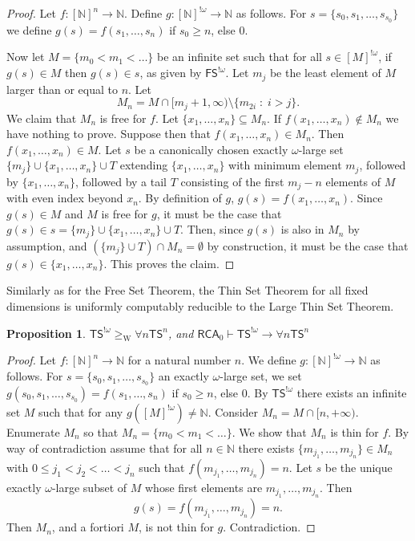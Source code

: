 \documentclass{article}
\newcommand{\RCA}[0]{\mathsf{RCA}}
\newcommand{\FS}[0]{\mathsf{FS}}
\newcommand{\TS}[0]{\mathsf{TS}}
\newcommand{\NN}[0]{\mathbb{N}}
\newcommand{\W}{\mathrm{W}}
\numberwithin{theorem}{section}
\newtheorem{proposition}[theorem]{Proposition}
\begin{document}
\begin{proof}
Let $f:[\NN]^n\to \NN$. Define $g:[\NN]^{!\omega} \to \NN$ as follows. For $s = \{s_0, s_1, \dots, s_{s_0}\}$ we define 
$g(s) = f(s_1, \dots, s_n)$ if $s_0 \geq n$, else $0$. 

Now let $M= \{ m_0 < m_1 < \dots\}$ be an infinite set such that for all $s\in [M]^{!\omega}$, if $g(s) \in M$ then 
$g(s) \in s$, as given by $\FS^{!\omega}$.
Let $m_j$ be the least element of $M$ larger than or equal to $n$. Let 
$$M_n=M \cap [m_j + 1, \infty) \setminus \{ m_{2i} \;:\; i > j \}.$$ 
We claim that $M_n$ is free for $f$. Let $\{x_1, \dots, x_n\}\subseteq M_n$. 
If $f(x_1, \dots, x_n) \notin M_n$ we have nothing to prove. Suppose then that
$f(x_1, \dots, x_n) \in M_n$. Then $f(x_1, \dots, x_n) \in M$. 
Let $s$ be a canonically chosen exactly $\omega$-large set $\{m_j\}\cup \{ x_1, \dots, x_n\} \cup T$
extending $\{x_1, \dots, x_n\}$ with minimum 
element $m_j$, followed by $\{x_1, \dots, x_n\}$, followed by a tail $T$ consisting of the first $m_j - n$ elements of $M$ with even index
beyond $x_n$. 
By definition of $g$, $g(s) = f(x_1, \dots, x_n)$. Since $g(s) \in M$ and $M$ is free for $g$, 
it must be the case that $g(s) \in s=\{m_j\}\cup \{ x_1, \dots, x_n\} \cup T$. Then, since $g(s)$ is also in $M_n$ by assumption, 
and $(\{m_j\}\cup T) \cap M_n = \emptyset$ by construction, 
it must be the case that $g(s) \in \{x_1, \dots, x_n\}$. This proves the claim. 
\end{proof}

Similarly as for the Free Set Theorem, the Thin Set Theorem for all fixed dimensions is uniformly computably reducible to the Large Thin Set Theorem. 

\begin{proposition}
$\TS^{!\omega} \geq_{\W} \forall n \TS^n$, and $\RCA_0\vdash \TS^{!\omega} \to \forall n \TS^n$
\end{proposition}
\begin{proof}
	Let  $f:[\NN]^{n}\to\NN$ for a natural number $n$. We define $g:[\NN]^{!\omega}\to \NN$ as follows.
	For $s=\{s_0,s_1,\dots,s_{s_0}\}$ an exactly $\omega$-large set, we set $g(s_0,s_1,\dots, s_{s_0}) = f(s_1,\dots,s_n)$ if $s_0 \geq n$, else $0$. By $\TS^{!\omega}$ there exists an infinite set $M$ such that for any $g([M]^{!\omega})\neq \NN$. Consider $M_n = M \cap [n, +\infty)$.
	Enumerate $M_n$ so that $M_n=\{m_0<m_1<\dots\}$. 
 	We show that $M_n$ is thin for $f$. By way of contradiction assume that for all $n\in \NN$ there exists $\{m_{j_1},\dots,m_{j_n}\}\in M_n$ with $0\leq j_1 < j_2 < \dots < j_n$ such that $f(m_{j_1},\dots,m_{j_n})=n$. Let $s$ be the unique exactly $\omega$-large subset of $M$ whose first elements are $m_{j_1},\dots,m_{j_n}$. Then
$$g(s)= f(m_{j_1},\dots,m_{j_n})=n.$$
Then $M_n$, and a fortiori $M$, is not thin for $g$. Contradiction.
\end{proof}
\end{document}
